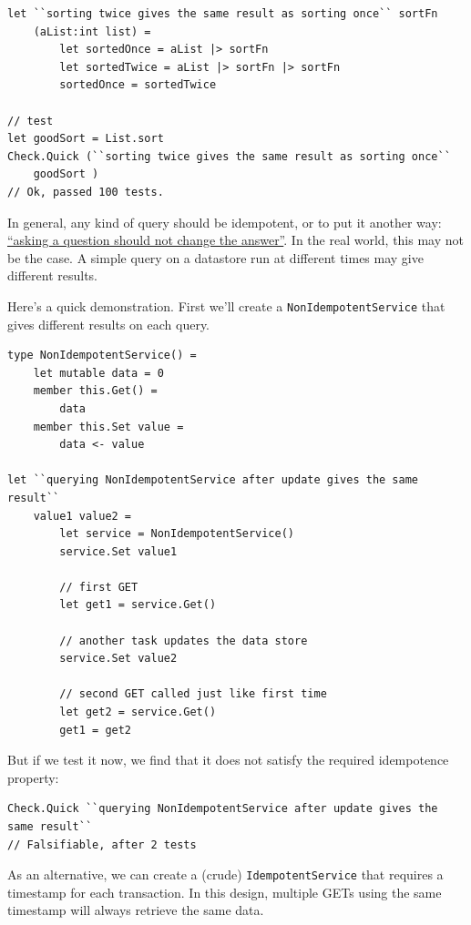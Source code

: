 \begin{verbatim}
let ``sorting twice gives the same result as sorting once`` sortFn 
    (aList:int list) =
        let sortedOnce = aList |> sortFn 
        let sortedTwice = aList |> sortFn |> sortFn 
        sortedOnce = sortedTwice

// test
let goodSort = List.sort
Check.Quick (``sorting twice gives the same result as sorting once`` 
    goodSort )
// Ok, passed 100 tests.
\end{verbatim}
In general, any kind of query should be idempotent, or to put it another
way:
\href{https://en.wikipedia.org/wiki/Command\%E2\%80\%93query_separation}{``asking
a question should not change the answer''}.
In the real world, this may not be the case. A simple query on a
datastore run at different times may give different results.

Here's a quick demonstration.
First we'll create a \texttt{NonIdempotentService} that gives different
results on each query.

\begin{verbatim}
type NonIdempotentService() =
    let mutable data = 0
    member this.Get() = 
        data
    member this.Set value = 
        data <- value

let ``querying NonIdempotentService after update gives the same result`` 
    value1 value2 =
        let service = NonIdempotentService()
        service.Set value1

        // first GET 
        let get1 = service.Get()

        // another task updates the data store
        service.Set value2

        // second GET called just like first time
        let get2 = service.Get() 
        get1 = get2 
\end{verbatim}
But if we test it now, we find that it does not satisfy the required
idempotence property:

\begin{verbatim}
Check.Quick ``querying NonIdempotentService after update gives the same result``
// Falsifiable, after 2 tests
\end{verbatim}
As an alternative, we can create a (crude) \texttt{IdempotentService}
that requires a timestamp for each transaction. In this design, multiple
GETs using the same timestamp will always retrieve the same data.

